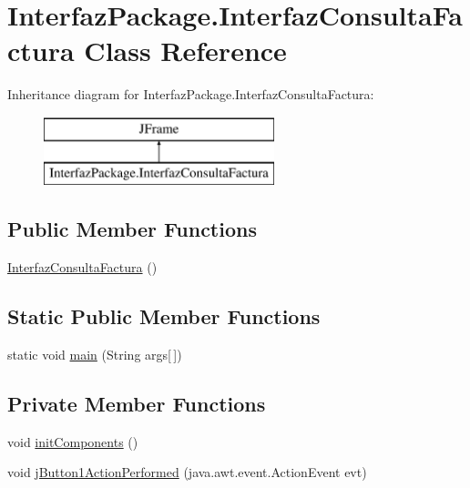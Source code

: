 \hypertarget{class_interfaz_package_1_1_interfaz_consulta_factura}{}\section{Interfaz\+Package.\+Interfaz\+Consulta\+Factura Class Reference}
\label{class_interfaz_package_1_1_interfaz_consulta_factura}
Inheritance diagram for Interfaz\+Package.\+Interfaz\+Consulta\+Factura\+:\begin{figure}[H]
\begin{center}
\leavevmode
\includegraphics[height=2.000000cm]{class_interfaz_package_1_1_interfaz_consulta_factura}
\end{center}
\end{figure}
\subsection*{Public Member Functions}
\begin{DoxyCompactItemize}
\item 
\mbox{\hyperlink{class_interfaz_package_1_1_interfaz_consulta_factura_ad3cdbc84d55cc6a8f2c75f7f0541b4e3}{Interfaz\+Consulta\+Factura}} ()
\end{DoxyCompactItemize}
\subsection*{Static Public Member Functions}
\begin{DoxyCompactItemize}
\item 
static void \mbox{\hyperlink{class_interfaz_package_1_1_interfaz_consulta_factura_a8a390d26acfd0f9ee484c817224cad35}{main}} (String args\mbox{[}$\,$\mbox{]})
\end{DoxyCompactItemize}
\subsection*{Private Member Functions}
\begin{DoxyCompactItemize}
\item 
void \mbox{\hyperlink{class_interfaz_package_1_1_interfaz_consulta_factura_a8c15050ad9e2115a11c3b06337c9bef2}{init\+Components}} ()
\item 
void \mbox{\hyperlink{class_interfaz_package_1_1_interfaz_consulta_factura_a794125608e988abb2f24a5506f65bacc}{j\+Button1\+Action\+Performed}} (java.\+awt.\+event.\+Action\+Event evt)
\end{DoxyCompactItemize}
